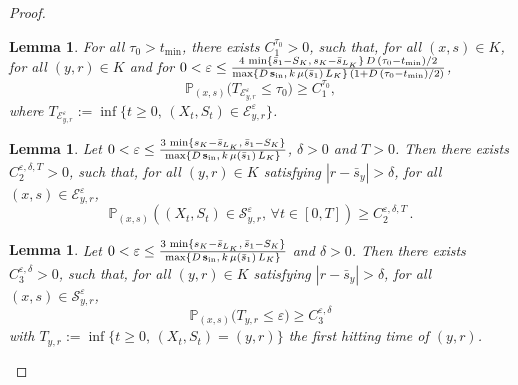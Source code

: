 \documentclass[10pt]{amsart}
\newtheorem{lemm}[theo]{Lemma}\newtheorem{prop}[theo]{Proposition}\newtheorem{coro}[theo]{Corollary}\newtheorem{conj}[theo]{Conjecture}
\theoremstyle{definition}\newtheorem{defi}[theo]{Definition}\newtheorem{rema}[theo]{Remark}\newtheorem{exam}[theo]{Example}\newtheorem{exem}[theo]{Example}\newtheorem{nota}[theo]{Notation}
\newcommand{\PP}{\mathbb{P}}
\newcommand{\clE}{\mathcal{E}}
\newcommand{\clS}{\mathcal{S}}
\newcommand{\Sin}{{\mathbf s}_{\textrm{\tiny\rm in}}}
\newcommand{\SminK}{s_K}
\newcommand{\SmaxK}{S_K}
\newcommand{\barmu}{\mu(\bar s_1)}
\newcommand{\lmax}{{L_K}}
\newcommand{\1}{\mathbf{1}}
\let\oldforall\forall
\renewcommand*{\forall}{\mathrel{\oldforall}}
\begin{document}
\begin{proof}
\begin{lemm}\label{de.partout.a.presque.partout}
For all $\tau_0>t_{\min}$, there exists $C_1^{\tau_0}>0$, such that, for all $(x,s)\in K$, for all $(y,r)\in K$ and for $0<\varepsilon\leq\frac{4\,\min\{\bar s_1-\SmaxK,\, \SminK-\bar s_{\lmax}\}\,D\,(\tau_0-t_{\min})/2}{\max\{D\,\Sin,\, k\,\barmu\,\lmax\}\,(1+D\,(\tau_0-t_{\min})/2)}$,
\[
\PP_{(x,s)}\big(T_{\clE_{y,r}^\varepsilon}
\leq \tau_0\big)\geq C_1^{\tau_0},
\]
where $T_{\clE_{y,r}^\varepsilon}:=\inf\{t\geq 0,\, (X_t,S_t)\in \clE_{y,r}^\varepsilon\}$.
\end{lemm}




\begin{lemm}\label{lemma.stay.in.S}
Let $0<\varepsilon\leq \frac{3\,\min\{\SminK-\bar s_{\lmax},\, \bar s_1-\SmaxK\}}{\max\{D\,\Sin,\, k\,\barmu\,\lmax\}}$, $\delta>0$ and $T>0$. Then there exists $C^{\varepsilon,\delta,T}_2>0$, such that, for all $(y,r)\in K$ satisfying $|r-\bar s_y|>\delta$, for all $(x,s) \in \clE_{y,r}^\varepsilon$,
\[
\PP_{(x,s)}
\left((X_t,S_t) \in \clS_{y,r}^\varepsilon, \,
\forall t\in[0,T]\right)\geq C^{\varepsilon,\delta,T}_2\,.
\]
\end{lemm}




\begin{lemm}\label{lemma.Tys.depuis.S}
Let $0<\varepsilon\leq \frac{3\,\min\{\SminK-\bar s_{\lmax},\, \bar s_1-\SmaxK\}}{\max\{D\,\Sin,\, k\,\barmu\,\lmax\}}$ and $\delta>0$. Then there exists $C^{\varepsilon,\delta}_3>0$, such that, for all $(y,r)\in K$ satisfying $|r-\bar s_y|>\delta$, for all $(x,s) \in \clS_{y,r}^\varepsilon$,
\[
\PP_{(x,s)}
\Big(T_{y,r} \leq \varepsilon \Big)\geq C^{\varepsilon,\delta}_3
\]
with $T_{y,r}:=\inf\{t\geq 0, \, (X_t,S_t)=(y,r)\}$ the first hitting time of $(y,r)$.
\end{lemm}




\end{proof}
\end{document}
